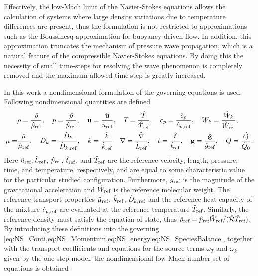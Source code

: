Effectively, the low-Mach limit of the Navier-Stokes equations allows the calculation of systems where large density variations due to temperature differences are present, thus the formulation is not restricted to approximations such as the Boussinesq approximation for buoyancy-driven flow. In addition, this approximation truncates the mechanism of pressure wave propagation, which is a natural feature of the compressible Navier-Stokes equations. By doing this the necessity of small time-steps for resolving the wave phenomenon is completely removed and the maximum allowed time-step is greatly increased.

In this work a nondimensional formulation of the governing equations is used. Following nondimensional quantities are defined
\begin{align*}
	      & \rho = \frac{\hat \rho}{\hat \rho_{\text{ref}}}, \quad
	p = \frac{\hat p}{\hat p_{\text{ref}}}, \quad
	\textbf{u}= \frac{\hat{\textbf{u}}}{\hat u_{\text{ref}}}, \quad
	T = \frac{\hat T}{\hat T_{\text{ref}}},  \quad
	c_p = \frac{\hat c_p}{\hat c_{p,\text{ref}}}, \quad
	W_k = \frac{\hat{W}_k}{\hat W_{\text{ref}}},
	\\
	\mu = & \frac{\hat \mu}{\hat \mu_{\text{ref}}},\quad
	D_k = \frac{\hat D_k}{\hat D_{k,\text{ref}}}, \quad
	k = \frac{\hat k}{\hat k_{\text{ref}}}\quad
	\nabla = \frac{\hat \nabla}{\hat L_{\text{ref}}}, \quad
	t = \frac{\hat{t}}{\hat t_{\text{ref}}},\quad
	\textbf{g} = \frac{\hat{\textbf{g}}}{\hat g_{\text{ref}}},\quad
	Q = \frac{\hat Q}{\hat{Q}_0}.
\end{align*}
Here $\hat u_{\text{ref}}, \hat L_{\text{ref}}$, $\hat p_{\text{ref}}$, $\hat t_{\text{ref}}$, and $\hat T_{\text{ref}}$ are the reference velocity, length, pressure, time, and temperature, respectively, and are equal to some characteristic value for the particular studied configuration. Furthermore, $\hat g_{\text{ref}}$ is the magnitude of the gravitational acceleration and $\hat W_{\text{ref}}$ is the reference molecular weight. The reference transport properties $\hat \mu_{\text{ref}}$, $\hat k_{\text{ref}}$, $\hat D_{k,\text{ref}}$ and the reference heat capacity of the mixture $\hat c_{p,\text{ref}}$ are evaluated at the reference temperature $\hat T_{\text{ref}}$. Similarly, the reference density must satisfy the equation of state, thus $\hat \rho_{\text{ref}} = \hat p_{\text{ref}}\hat W_{\text{ref}}/(\hat{\mathcal{R}}\hat T_{\text{ref}})$.  By introducing these definitions into the governing  \cref{eq:NS_Conti,eq:NS_Momentum,eq:NS_energy,eq:NS_SpeciesBalance}, together with the transport coefficients and equations for the source terms $\omega_T$ and $\omega_k$ given by the one-step model, the nondimensional low-Mach number set of equations is obtained
